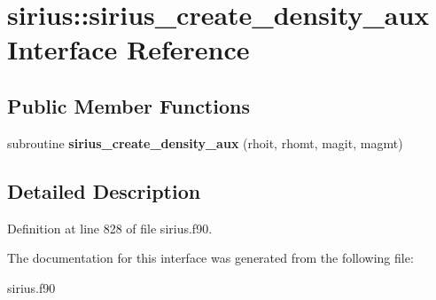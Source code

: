 \hypertarget{interfacesirius_1_1sirius__create__density__aux}{}\section{sirius\+:\+:sirius\+\_\+create\+\_\+density\+\_\+aux Interface Reference}
\label{interfacesirius_1_1sirius__create__density__aux}
\subsection*{Public Member Functions}
\begin{DoxyCompactItemize}
\item 
\hypertarget{interfacesirius_1_1sirius__create__density__aux_a7fa60e92574a49a6dd6daa77ead92e1e}{}subroutine {\bfseries sirius\+\_\+create\+\_\+density\+\_\+aux} (rhoit, rhomt, magit, magmt)\label{interfacesirius_1_1sirius__create__density__aux_a7fa60e92574a49a6dd6daa77ead92e1e}

\end{DoxyCompactItemize}


\subsection{Detailed Description}


Definition at line 828 of file sirius.\+f90.



The documentation for this interface was generated from the following file\+:\begin{DoxyCompactItemize}
\item 
sirius.\+f90\end{DoxyCompactItemize}

